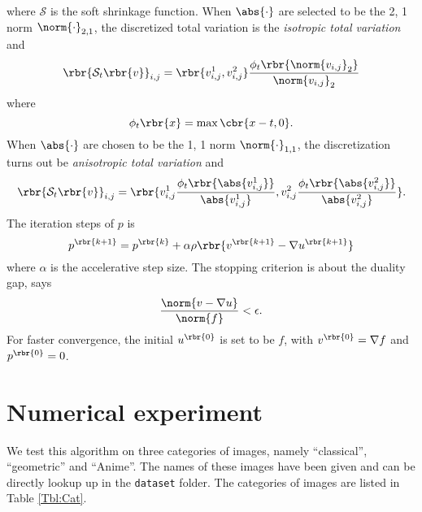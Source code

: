 \documentclass[english, nochinese]{pnote}
\begin{document}
where $\mathcal{S}$ is the soft shrinkage function. When $\abs{\cdot}$ are selected to be the 2, 1 norm $ \norm{\cdot}_{ 2, 1 } $, the discretized total variation is the \emph{isotropic total variation} and
\begin{equation}
\rbr{ \mathcal{S}_t \rbr{v} }_{ i, j } = \rbr{ v_{ i, j }^1, v_{ i, j }^2 } \frac{ \phi_t \rbr{\norm{v_{ i, j }}_2} }{\norm{v_{ i, j }}_2}
\end{equation}
where
\begin{equation}
\phi_t \rbr{x} = \max \cbr{ x - t, 0 }.
\end{equation}
When $\abs{\cdot}$ are chosen to be the 1, 1 norm $ \norm{\cdot}_{ 1, 1 } $, the discretization turns out be \emph{anisotropic total variation} and
\begin{equation}
\rbr{ \mathcal{S}_t \rbr{v} }_{ i, j } = \rbr{ v_{ i, j }^1 \frac{ \phi_t \rbr{\abs{v_{ i, j }^1}} }{\abs{v_{ i, j }^1}}, v_{ i, j }^2 \frac{ \phi_t \rbr{\abs{v_{ i, j }^2}} }{\abs{v_{ i, j }^2}} }.
\end{equation}
The iteration steps of $p$ is
\begin{equation}
p^{\rbr{ k + 1 }} = p^{\rbr{k}} + \alpha \rho \rbr{ v^{\rbr{ k + 1 }} - \nabla u^{\rbr{ k + 1 }} }
\end{equation}
where $\alpha$ is the accelerative step size. The stopping criterion is about the duality gap, says
\begin{equation}
\frac{\norm{ v - \nabla u }}{\norm{f}} < \epsilon.
\end{equation}
For faster convergence, the initial $u^{\rbr{0}}$ is set to be $f$, with $ v^{\rbr{0}} = \nabla f $ and $ p^{\rbr{0}} = 0 $.

\section{Numerical experiment}

We test this algorithm on three categories of images, namely ``classical'', ``geometric'' and ``Anime''. The names of these images have been given and can be directly lookup up in the \verb"dataset" folder. The categories of images are listed in Table \ref{Tbl:Cat}.
\end{document}
